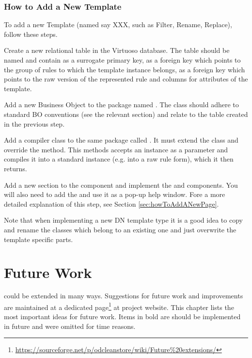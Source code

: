 \subsection{How to Add a New \DN Template}
\label{sec:howToAddANewDNTemplate}

To add a new \DN Template (named say XXX, such as Filter, Rename, Replace), follow these steps.

Create a new relational table in the Virtuoso database. The table should be named  and contain  as a surrogate primary key,  as a foreign key which points to the group of rules to which the template instance belongs,  as a foreign key which points to the raw version of the represented rule and columns for attributes of the template.

Add a new Business Object to the  package named . The class should adhere to standard BO conventions (see the relevant section) and relate to the table created in the previous step.

Add a compiler class to the same package called . It must extend the  class and override the  method. This methods accepts an  instance as a parameter and compiles it into a standard  instance (e.g. into a raw rule form), which it then returns.

Add a new section to the  component and implement the \linebreak{} and  components. You will also need to add the  and use it as a pop-up help window. Fore a more detailed explanation of this step, see Section \ref{sec:howToAddANewPage}.

Note that when implementing a new DN template type it is a good idea to copy and rename the classes which belong to an existing one and just overwrite the template specific parts.



\chapter{Future Work}
\odcs could be extended in many ways. Suggestions for future work and improvements are maintained at a dedicated page\footnote{\url{https://sourceforge.net/p/odcleanstore/wiki/Future\%20extensions/}} at project website. This chapter lists the most important ideas for future work. Items in bold are should be implemented in future and were omitted for time reasons.

